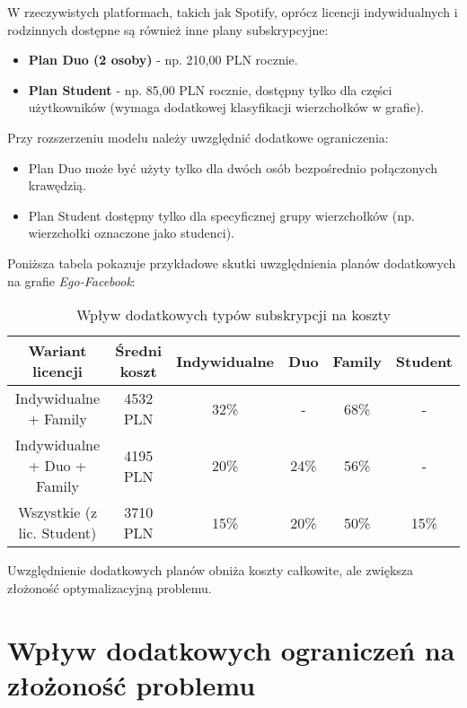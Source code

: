 W rzeczywistych platformach, takich jak Spotify, oprócz licencji indywidualnych i rodzinnych dostępne są również inne plany subskrypcyjne:

\begin{itemize}
    \item \textbf{Plan Duo (2 osoby)} - np. 210,00 PLN rocznie.
    \item \textbf{Plan Student} - np. 85,00 PLN rocznie, dostępny tylko dla części użytkowników (wymaga dodatkowej klasyfikacji wierzchołków w grafie).
\end{itemize}

Przy rozszerzeniu modelu należy uwzględnić dodatkowe ograniczenia:

\begin{itemize}
    \item Plan Duo może być użyty tylko dla dwóch osób bezpośrednio połączonych krawędzią.
    \item Plan Student dostępny tylko dla specyficznej grupy wierzchołków (np. wierzchołki oznaczone jako studenci).
\end{itemize}

Poniższa tabela pokazuje przykładowe skutki uwzględnienia planów dodatkowych na grafie \textit{Ego-Facebook}:

\begin{table}[h]
\centering
\begin{tabular}{|c|c|c|c|c|c|}
\hline
\textbf{Wariant licencji} & \textbf{Średni koszt} & \textbf{Indywidualne} & \textbf{Duo} & \textbf{Family} & \textbf{Student} \\
\hline
Indywidualne + Family & 4532 PLN & 32\% & - & 68\% & - \\
Indywidualne + Duo + Family & 4195 PLN & 20\% & 24\% & 56\% & - \\
Wszystkie (z lic. Student) & 3710 PLN & 15\% & 20\% & 50\% & 15\% \\
\hline
\end{tabular}
\caption{Wpływ dodatkowych typów subskrypcji na koszty}
\label{tab:subscription_plans}
\end{table}

Uwzględnienie dodatkowych planów obniża koszty całkowite, ale zwiększa złożoność optymalizacyjną problemu.

\section{Wpływ dodatkowych ograniczeń na złożoność problemu}

